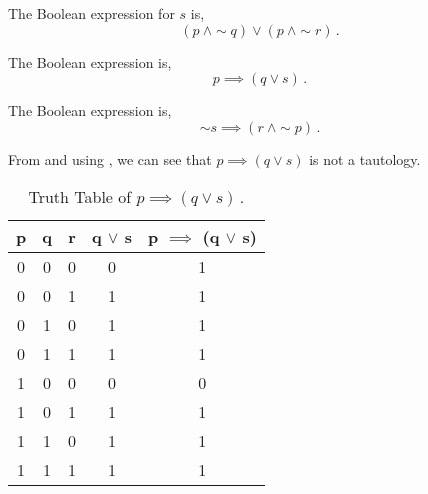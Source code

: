 \begin{subquestions}
\subquestion

The Boolean expression for $s$ is,
\begin{equation}
	(p ~\land \sim q) \lor (p ~\land \sim r)\,.
\end{equation}


\subquestion

\begin{subsubquestions}
	
\subsubquestion

The Boolean expression is,
\begin{equation}
	p \implies (q \lor s)\,.
\end{equation}


\subsubquestion

The Boolean expression is,
\begin{equation}
	\sim s \implies (r ~\land \sim p)\,.
\end{equation}


\subsubquestion

From  and using , we can see that $p \implies (q \lor s)$ is not a tautology.
\begin{table}[ht]
	\centering
	\begin{tabular}{|c|c|c|c|c|}
		\hline
		p & q & r & q $\lor$ s & p $\implies$ (q $\lor$ s) \\
		\hline
		0 & 0 & 0 & 0 & 1 \\
		0 & 0 & 1 & 1 & 1 \\
		0 & 1 & 0 & 1 & 1 \\
		0 & 1 & 1 & 1 & 1 \\
		1 & 0 & 0 & 0 & 0 \\
		1 & 0 & 1 & 1 & 1 \\
		1 & 1 & 0 & 1 & 1 \\
		1 & 1 & 1 & 1 & 1 \\
		\hline
	\end{tabular}
	\caption{\label{2016:q1:tab:TruthTab2} Truth Table of $p \implies (q \lor s)$\,.}
\end{table}

\end{subsubquestions}

\end{subquestions}

